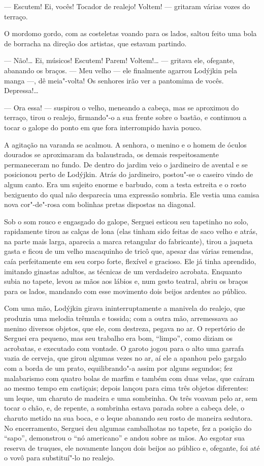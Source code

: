 --- Escutem! Ei, vocês! Tocador de realejo! Voltem! --- gritaram várias
vozes do terraço.

O mordomo gordo, com as costeletas voando para os lados, saltou feito
uma bola de borracha na direção dos artistas, que estavam partindo.

--- Não!\ldots{} Ei, músicos! Escutem! Parem! Voltem!\ldots{} --- gritava ele,
ofegante, abanando os braços. --- Meu velho --- ele finalmente agarrou
Lodýjkin pela manga ---, dê meia"-volta! Os senhores irão ver a pantomima
de vocês. Depressa!\ldots{}

--- Ora essa! --- suspirou o velho, meneando a cabeça, mas se aproximou
do terraço, tirou o realejo, firmando"-o a sua frente sobre o bastão, e
continuou a tocar o galope do ponto em que fora interrompido havia
pouco.

A agitação na varanda se acalmou. A senhora, o menino e o homem de
óculos dourados se aproximaram da balaustrada, os demais respeitosamente
permaneceram no fundo. De dentro do jardim veio o jardineiro de avental
e se posicionou perto de Lodýjkin. Atrás do jardineiro, postou"-se o
caseiro vindo de algum canto. Era um sujeito enorme e barbudo, com a
testa estreita e o rosto bexiguento do qual não desparecia uma expressão
sombria. Ele vestia uma camisa nova cor"-de"-rosa com bolinhas pretas
dispostas na diagonal.

Sob o som rouco e engasgado do galope, Serguei esticou seu tapetinho no
solo, rapidamente tirou as calças de lona (elas tinham sido feitas de
saco velho e atrás, na parte mais larga, aparecia a marca retangular do
fabricante), tirou a jaqueta gasta e ficou de um velho macaquinho de
tricô que, apesar das várias remendas, caía perfeitamente em seu corpo
forte, flexível e gracioso. Ele já tinha aprendido, imitando ginastas
adultos, as técnicas de um verdadeiro acrobata. Enquanto subia no
tapete, levou as mãos aos lábios e, num gesto teatral, abriu os braços
para os lados, mandando com esse movimento dois beijos ardentes ao
público.

Com uma mão, Lodýjkin girava ininterruptamente a manivela do realejo,
que produzia uma melodia trêmula e tossida; com a outra mão, arremessava
ao menino diversos objetos, que ele, com destreza, pegava no ar. O
repertório de Serguei era pequeno, mas seu trabalho era bom, ``limpo'',
como diziam os acrobatas, e executado com vontade. O garoto jogou para o
alto uma garrafa vazia de cerveja, que girou algumas vezes no ar, aí ele
a apanhou pelo gargalo com a borda de um prato, equilibrando"-a assim por
alguns segundos; fez malabarismo com quatro bolas de marfim e também com
duas velas, que caíram ao mesmo tempo em castiçais; depois lançou para
cima três objetos diferentes: um leque, um charuto de madeira e uma
sombrinha. Os três voavam pelo ar, sem tocar o chão, e, de repente, a
sombrinha estava parada sobre a cabeça dele, o charuto metido na sua
boca, e o leque abanando seu rosto de maneira sedutora. No encerramento,
Serguei deu algumas cambalhotas no tapete, fez a posição do ``sapo'',
demonstrou o ``nó americano'' e andou sobre as mãos. Ao esgotar sua
reserva de truques, ele novamente lançou dois beijos ao público e,
ofegante, foi até o vovô para substituí"-lo no realejo.

